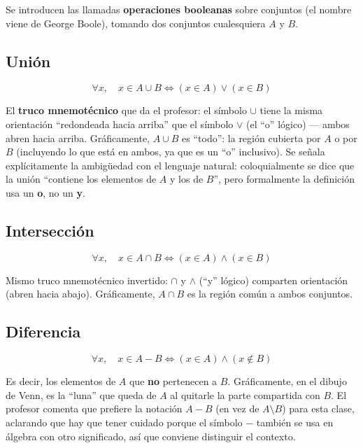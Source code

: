 \documentclass[12pt,a4paper]{article}
\begin{document}
Se introducen las llamadas \textbf{operaciones booleanas} sobre conjuntos (el nombre viene de George Boole), tomando dos conjuntos cualesquiera $A$ y $B$.

\subsection{Unión}
\begin{keybox}[Unión]
$$\boxed{\forall x,\quad x \in A \cup B \iff (x \in A) \vee (x \in B)}$$
\end{keybox}

El \textbf{truco mnemotécnico} que da el profesor: el símbolo $\cup$ tiene la misma orientación ``redondeada hacia arriba'' que el símbolo $\vee$ (el ``o'' lógico) — ambos abren hacia arriba. Gráficamente, $A \cup B$ es ``todo'': la región cubierta por $A$ o por $B$ (incluyendo lo que está en ambos, ya que es un ``o'' inclusivo). Se señala explícitamente la ambigüedad con el lenguaje natural: coloquialmente se dice que la unión ``contiene los elementos de $A$ y los de $B$'', pero formalmente la definición usa un \textbf{o}, no un \textbf{y}.

\subsection{Intersección}
\begin{keybox}[Intersección]
$$\boxed{\forall x,\quad x \in A \cap B \iff (x \in A) \wedge (x \in B)}$$
\end{keybox}

Mismo truco mnemotécnico invertido: $\cap$ y $\wedge$ (``y'' lógico) comparten orientación (abren hacia abajo). Gráficamente, $A \cap B$ es la región común a ambos conjuntos.

\subsection{Diferencia}
\begin{keybox}[Diferencia]
$$\boxed{\forall x,\quad x \in A - B \iff (x \in A) \wedge (x \notin B)}$$
\end{keybox}

Es decir, los elementos de $A$ que \textbf{no} pertenecen a $B$. Gráficamente, en el dibujo de Venn, es la ``luna'' que queda de $A$ al quitarle la parte compartida con $B$. El profesor comenta que prefiere la notación $A-B$ (en vez de $A \setminus B$) para esta clase, aclarando que hay que tener cuidado porque el símbolo $-$ también se usa en álgebra con otro significado, así que conviene distinguir el contexto.
\end{document}
